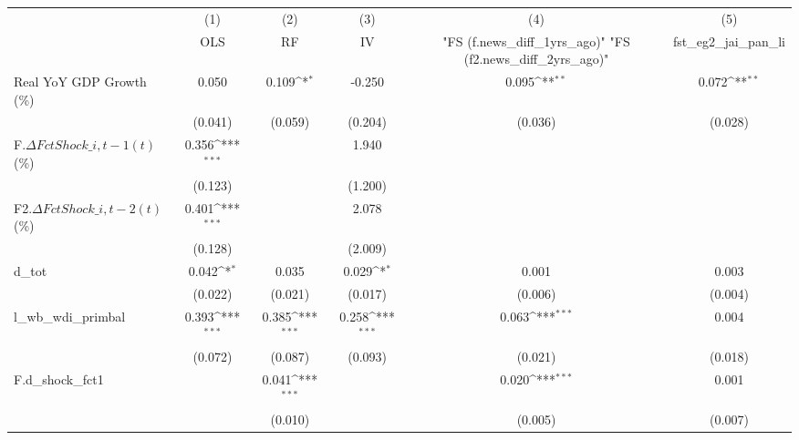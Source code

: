 {
\def\sym#1{\ifmmode^{#1}\else\(^{#1}\)\fi}
\begin{tabular}{l*{5}{c}}
\toprule
                    &\multicolumn{1}{c}{(1)}&\multicolumn{1}{c}{(2)}&\multicolumn{1}{c}{(3)}&\multicolumn{1}{c}{(4)}&\multicolumn{1}{c}{(5)}\\
                    &\multicolumn{1}{c}{OLS}&\multicolumn{1}{c}{RF}&\multicolumn{1}{c}{IV}&\multicolumn{1}{c}{ "FS (f.news\_diff\_1yrs\_ago)"  "FS (f2.news\_diff\_2yrs\_ago)" }&\multicolumn{1}{c}{fst\_eg2\_jai\_pan\_li}\\
\midrule
Real YoY GDP Growth (\%)&       0.050         &       0.109\sym{*}  &      -0.250         &       0.095\sym{**} &       0.072\sym{**} \\
                    &     (0.041)         &     (0.059)         &     (0.204)         &     (0.036)         &     (0.028)         \\
\addlinespace
F.$\Delta FctShock\_{i,t-1}(t)$ (\%)&       0.356\sym{***}&                     &       1.940         &                     &                     \\
                    &     (0.123)         &                     &     (1.200)         &                     &                     \\
\addlinespace
F2.$\Delta FctShock\_{i,t-2}(t)$ (\%)&       0.401\sym{***}&                     &       2.078         &                     &                     \\
                    &     (0.128)         &                     &     (2.009)         &                     &                     \\
\addlinespace
d\_tot               &       0.042\sym{*}  &       0.035         &       0.029\sym{*}  &       0.001         &       0.003         \\
                    &     (0.022)         &     (0.021)         &     (0.017)         &     (0.006)         &     (0.004)         \\
\addlinespace
l\_wb\_wdi\_primbal    &       0.393\sym{***}&       0.385\sym{***}&       0.258\sym{***}&       0.063\sym{***}&       0.004         \\
                    &     (0.072)         &     (0.087)         &     (0.093)         &     (0.021)         &     (0.018)         \\
\addlinespace
F.d\_shock\_fct1      &                     &       0.041\sym{***}&                     &       0.020\sym{***}&       0.001         \\
                    &                     &     (0.010)         &                     &     (0.005)         &     (0.007)         \\

\end{tabular}}
